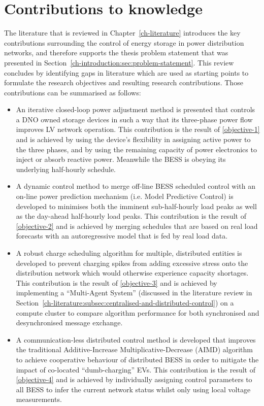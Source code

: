 \section{Contributions to knowledge}
\label{ch-introduction:sec:contributions}

The literature that is reviewed in Chapter~\ref{ch-literature} introduces the key contributions surrounding the control of energy storage in power distribution networks, and therefore supports the thesis problem statement that was presented in Section~\ref{ch-introduction:sec:problem-statement}.
This review concludes by identifying gaps in literature which are used as starting points to formulate the research objectives and resulting research contributions.
Those contributions can be summarised as follows:

\begin{itemize}
	\item
	An iterative closed-loop power adjustment method is presented that controls a DNO owned storage devices in such a way that its three-phase power flow improves LV network operation.
	This contribution is the result of \ref{objective-1} and is achieved by using the device's flexibility in assigning active power to the three phases, and by using the remaining capacity of power electronics to inject or absorb reactive power.
	Meanwhile the BESS is obeying its underlying half-hourly schedule.
	\item
	A dynamic control method to merge off-line BESS scheduled control with an on-line power prediction mechanism (i.e. Model Predictive Control) is developed to minimises both the imminent sub-half-hourly load peaks as well as the day-ahead half-hourly load peaks.
	This contribution is the result of \ref{objective-2} and is achieved by merging schedules that are based on real load forecasts with an autoregressive model that is fed by real load data.
	\item
	A robust charge scheduling algorithm for multiple, distributed entities is developed to prevent charging spikes from adding excessive stress onto the distribution network which would otherwise experience capacity shortages.
	This contribution is the result of \ref{objective-3} and is achieved by implementing a ``Multi-Agent System'' (discussed in the literature review in Section~\ref{ch-literature:subsec:centralised-and-distributed-control}) on a compute cluster to compare algorithm performance for both synchronised and desynchronised message exchange.
	\item
	A communication-less distributed control method is developed that improves the traditional Additive-Increase Multiplicative-Decrease (AIMD) algorithm to achieve cooperative behaviour of distributed BESS in order to mitigate the impact of co-located ``dumb-charging'' EVs.
	This contribution is the result of \ref{objective-4} and is achieved by individually assigning control parameters to all BESS to infer the current network status whilst only using local voltage measurements.
\end{itemize}

